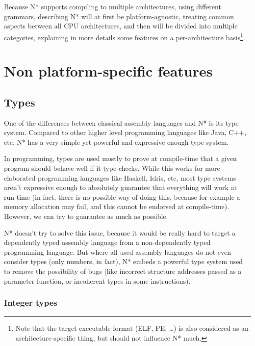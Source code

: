 \vspace{\baselineskip}

Because N* supports compiling to multiple architectures, using different grammars, describing N* will at first be platform-agnostic, treating common aspects between all CPU architectures, and then will be divided into multiple categories, explaining in more details some features on a per-architecture basis\footnote{Note that the target executable format (ELF, PE, \ldots) is also considered as an architecture-specific thing, but should not influence N* much.}.

\chapter{Non platform-specific features}\label{chap:nstar-common}

\section{Types}\label{sec:nstar-common-ts}

One of the differences between classical assembly languages and N* is its type system.
Compared to other higher level programming languages like Java, C++, etc, N* has a very simple yet powerful and expressive enough type system.

In programming, types are used mostly to prove at compile-time that a given program should behave well if it type-checks. While this works for more elaborated programming languages like Haskell, Idris, etc, most type systems aren't expressive enough to absolutely guarantee that everything will work at run-time (in fact, there is no possible way of doing this, because for example a memory allocation may fail, and this cannot be endorsed at compile-time). However, we can try to guarantee as much as possible.

N* doesn't try to solve this issue, because it would be really hard to target a dependently typed assembly language from a non-dependently typed programming language. But where all used assembly languages do not even consider types (only numbers, in fact), N* embeds a powerful type system used to remove the possibility of bugs (like incorrect structure addresses passed as a parameter function, or incoherent types in some instructions).

\subsection{Integer types}\label{subsec:nstar-common-ts-integer}

